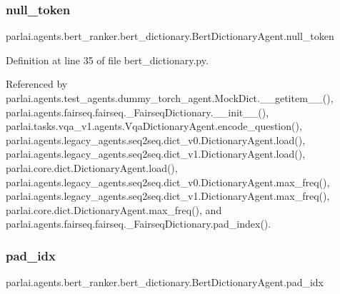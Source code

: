 \subsubsection{\texorpdfstring{null\+\_\+token}{null\_token}}
{\footnotesize\ttfamily parlai.\+agents.\+bert\+\_\+ranker.\+bert\+\_\+dictionary.\+Bert\+Dictionary\+Agent.\+null\+\_\+token}



Definition at line 35 of file bert\+\_\+dictionary.\+py.



Referenced by parlai.\+agents.\+test\+\_\+agents.\+dummy\+\_\+torch\+\_\+agent.\+Mock\+Dict.\+\_\+\+\_\+getitem\+\_\+\+\_\+(), parlai.\+agents.\+fairseq.\+fairseq.\+\_\+\+Fairseq\+Dictionary.\+\_\+\+\_\+init\+\_\+\+\_\+(), parlai.\+tasks.\+vqa\+\_\+v1.\+agents.\+Vqa\+Dictionary\+Agent.\+encode\+\_\+question(), parlai.\+agents.\+legacy\+\_\+agents.\+seq2seq.\+dict\+\_\+v0.\+Dictionary\+Agent.\+load(), parlai.\+agents.\+legacy\+\_\+agents.\+seq2seq.\+dict\+\_\+v1.\+Dictionary\+Agent.\+load(), parlai.\+core.\+dict.\+Dictionary\+Agent.\+load(), parlai.\+agents.\+legacy\+\_\+agents.\+seq2seq.\+dict\+\_\+v0.\+Dictionary\+Agent.\+max\+\_\+freq(), parlai.\+agents.\+legacy\+\_\+agents.\+seq2seq.\+dict\+\_\+v1.\+Dictionary\+Agent.\+max\+\_\+freq(), parlai.\+core.\+dict.\+Dictionary\+Agent.\+max\+\_\+freq(), and parlai.\+agents.\+fairseq.\+fairseq.\+\_\+\+Fairseq\+Dictionary.\+pad\+\_\+index().

\mbox{\label{classparlai_1_1agents_1_1bert__ranker_1_1bert__dictionary_1_1BertDictionaryAgent_a27aa43e578c745c4f7a340973a9e9eff}} 
\subsubsection{\texorpdfstring{pad\+\_\+idx}{pad\_idx}}
{\footnotesize\ttfamily parlai.\+agents.\+bert\+\_\+ranker.\+bert\+\_\+dictionary.\+Bert\+Dictionary\+Agent.\+pad\+\_\+idx}



